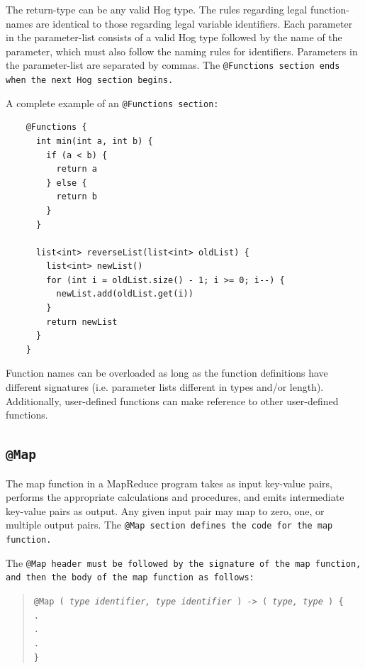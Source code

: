 \documentclass{article}
\begin{document}
The return-type can be any valid Hog type. The rules regarding legal function-names
are identical to those regarding legal variable identifiers. Each parameter in the
parameter-list consists of a valid Hog type followed by the name of the parameter,
which must also follow the naming rules for identifiers. Parameters in the
parameter-list are separated by commas. The \tt @Functions \rm section ends when the next
Hog section begins.

A complete example of an \tt @Functions \rm section:

\begin{verbatim}
    @Functions {
      int min(int a, int b) {
        if (a < b) {
          return a
        } else {
          return b
        }
      }

      list<int> reverseList(list<int> oldList) {
        list<int> newList()
        for (int i = oldList.size() - 1; i >= 0; i--) {
          newList.add(oldList.get(i))
        }
        return newList
      }
    }
\end{verbatim}

Function names can be overloaded as long as the function definitions have different
signatures (i.e. parameter lists different in types and/or length). Additionally,
user-defined functions can make reference to other user-defined functions.


\subsection{\tt @Map \rm} %
\label{sub:tt_map_rm}

The map function in a MapReduce program takes as input key-value pairs, performs
the appropriate calculations and procedures, and emits intermediate key-value
pairs as output. Any given input pair may map to zero, one, or multiple output
pairs. The \tt @Map \rm section defines the code for the map function.

The \tt @Map \rm header must be followed by the signature of the map function, and
then the body of the map function as follows:

\begin{quotation}
  \tt @Map ( \rm \emph{type identifier, type identifier} \tt ) -> ( \rm \emph{type, type} \tt ) \{ \\
  \indent \indent . \\
  \indent \indent . \\
  \indent \indent . \\
  \indent \tt \} \rm
\end{quotation}
\end{document}
